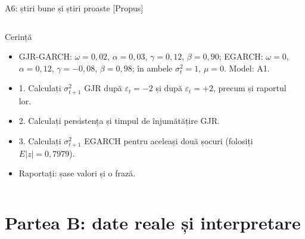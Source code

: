 \begin{frame}{A6: știri bune și știri proaste [Propus]}
\propsub
\itemsize{\scriptsize}
\begin{columns}[T]
\begin{column}{\taskw}
\begin{block}{Cerință}
\begin{itemize}
    \item GJR-GARCH: $\omega = 0{,}02$, $\alpha = 0{,}03$, $\gamma = 0{,}12$, $\beta = 0{,}90$; EGARCH: $\omega = 0$, $\alpha = 0{,}12$, $\gamma = -0{,}08$, $\beta = 0{,}98$; în ambele $\sigma_t^2 = 1$, $\mu = 0$. Model: A1.
    \item 1. Calculați $\sigma_{t+1}^2$ GJR după $\varepsilon_t = -2$ și după $\varepsilon_t = +2$, precum și raportul lor.
    \item 2. Calculați persistența și timpul de înjumătățire GJR.
    \item 3. Calculați $\sigma_{t+1}^2$ EGARCH pentru aceleași două șocuri (folosiți $E|z| = 0{,}7979$).
    \item Raportați: șase valori și o frază.
\end{itemize}
\end{block}
\end{column}
\begin{column}{\solw}
\end{column}
\end{columns}
\end{frame}


\section{Partea B: date reale și interpretare}

